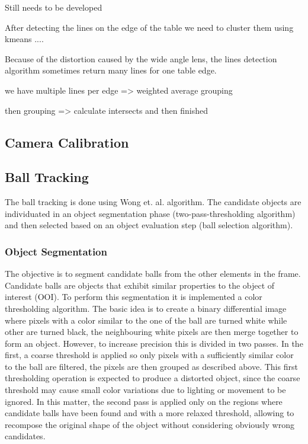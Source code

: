 \documentclass[a4paper]{article}
\begin{document}
Still needs to be developed 

After detecting the lines on the edge of the table we need to cluster them using kmeans ....

Because of the distortion caused by the wide angle lens, the lines detection algorithm sometimes return many lines for one table edge.

we have multiple lines per edge =>  weighted average grouping

then grouping => calculate intersects and then finished

\subsection{Camera Calibration}
\subsection{Ball Tracking}

The ball tracking is done using Wong et. al.\cite{Wong} algorithm. The candidate objects are individuated in an object segmentation phase (two-pass-thresholding algorithm) and then selected based on an object evaluation step (ball selection algorithm). 

\subsubsection{Object Segmentation}

The objective is to segment candidate balls from the other elements in the frame. Candidate balls are objects that exhibit similar properties to the object of interest (OOI). To perform this segmentation it is implemented a color thresholding algorithm. The basic idea is to create a binary differential image where pixels with a color similar to the one of the ball are turned white while other are turned black, the neighbouring white pixels are then merge together to form an object. However, to increase precision this is divided in two passes. In the first, a coarse threshold is applied so only pixels with a sufficiently similar color to the ball are filtered, the pixels are then grouped as described above. This first thresholding operation is expected to produce a distorted object, since the coarse threshold may cause small color variations due to lighting or movement to be ignored. In this matter, the second pass is applied only on the regions where candidate balls have been found and with a more relaxed threshold, allowing to recompose the original shape of the object without considering obviously wrong candidates. 
\end{document}
